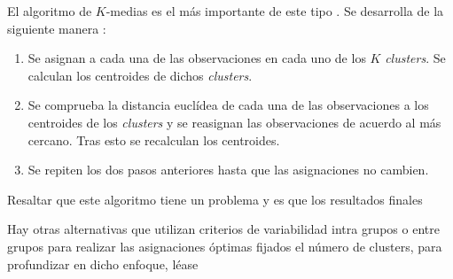 \noindent El algoritmo de $K$-medias es el más importante de este tipo \cite{Johnson 2007}. Se desarrolla de la siguiente manera  :
\begin{enumerate}
\item Se asignan a cada una de las observaciones en cada uno de los $K$ \emph{clusters}. Se calculan los centroides de dichos \emph{clusters}.
\item Se comprueba la distancia euclídea de cada una de las observaciones a los centroides de los \emph{clusters} y se reasignan las observaciones de acuerdo al  más cercano. Tras esto se recalculan los centroides.
\item Se repiten los dos pasos anteriores hasta que las asignaciones no cambien. 
\end{enumerate}

\noindent Resaltar que este algoritmo tiene un problema y es que los resultados finales 

\noindent Hay otras alternativas que utilizan criterios de variabilidad intra grupos o entre grupos para realizar las asignaciones óptimas fijados el número de clusters, para profundizar en dicho enfoque, léase \cite{Everitt 2011, Peña 2002, Hartigan 1975}







